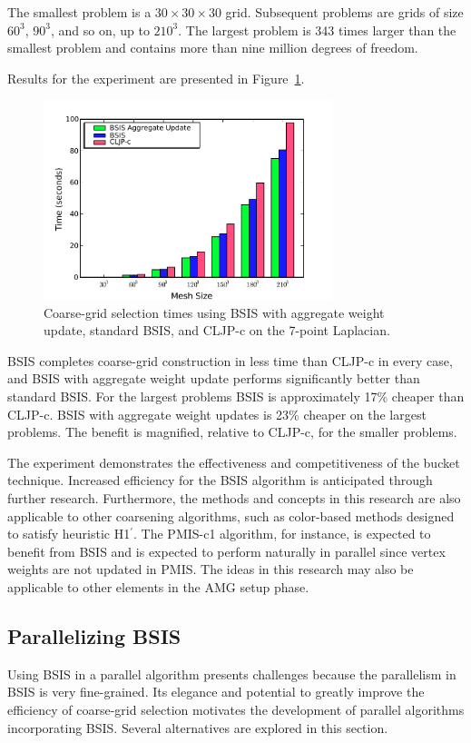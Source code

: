 \documentclass{elsart}
\begin{document}
The smallest problem is a $30 \times 30 \times 30$ grid. Subsequent
problems are grids of size $60^3$, $90^3$, and so on, up to
$210^3$. The largest problem is 343 times larger than the smallest
problem and contains more than nine million degrees of freedom.

Results for the experiment are presented in
Figure~\ref{5:fig:results-full}.
\begin{figure}
  \begin{center}
    \includegraphics[width=0.75\textwidth]{images/agg-no-scaling}
    \caption{Coarse-grid selection times using BSIS with aggregate
    weight update, standard BSIS, and CLJP-c on the 7-point
    Laplacian.}
    \label{5:fig:results-full}
  \end{center}
\end{figure}
BSIS completes coarse-grid construction in less time than CLJP-c in
every case, and BSIS with aggregate weight update performs
significantly better than standard BSIS. For the largest problems BSIS
is approximately 17\% cheaper than CLJP-c. BSIS with aggregate weight
updates is 23\% cheaper on the largest problems. The benefit is
magnified, relative to CLJP-c, for the smaller problems.

The experiment demonstrates the effectiveness and competitiveness of
the bucket technique. Increased efficiency for the BSIS algorithm is
anticipated through further research. Furthermore, the methods and
concepts in this research are also applicable to other coarsening
algorithms, such as color-based methods designed to satisfy heuristic
H1$^\prime$. The PMIS-c1 algorithm, for instance, is expected to
benefit from BSIS and is expected to perform naturally in parallel
since vertex weights are not updated in PMIS. The ideas in this
research may also be applicable to other elements in the AMG setup
phase.

\subsection{Parallelizing BSIS}
Using BSIS in a parallel algorithm presents challenges because the
parallelism in BSIS is very fine-grained. Its elegance and potential
to greatly improve the efficiency of coarse-grid selection motivates
the development of parallel algorithms incorporating BSIS. Several
alternatives are explored in this section.
\end{document}
